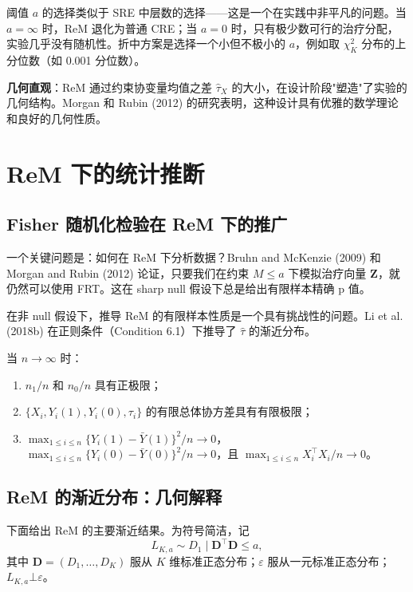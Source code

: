 阈值 $a$ 的选择类似于 SRE 中层数的选择——这是一个在实践中非平凡的问题。当 $a = \infty$ 时，ReM 退化为普通 CRE；当 $a = 0$ 时，只有极少数可行的治疗分配，实验几乎没有随机性。折中方案是选择一个小但不极小的 $a$，例如取 $\chi_K^2$ 分布的上分位数（如 0.001 分位数）。

\textbf{几何直观}：ReM 通过约束协变量均值之差 $\hat{\tau}_X$ 的大小，在设计阶段"塑造"了实验的几何结构。Morgan 和 Rubin (2012) 的研究表明，这种设计具有优雅的数学理论和良好的几何性质。

\section{ReM 下的统计推断}\label{sec:6-rem-inference}

\subsection{Fisher 随机化检验在 ReM 下的推广}\label{sec:6-rem-frt}

一个关键问题是：如何在 ReM 下分析数据？Bruhn and McKenzie (2009) 和 Morgan and Rubin (2012) 论证，只要我们在约束 $M \leq a$ 下模拟治疗向量 $\mathbf{Z}$，就仍然可以使用 FRT。这在 sharp null 假设下总是给出有限样本精确 p 值。

在非 null 假设下，推导 ReM 的有限样本性质是一个具有挑战性的问题。Li et al. (2018b) 在正则条件（Condition 6.1）下推导了 $\hat{\tau}$ 的渐近分布。

\begin{Condition}[条件 6.1]\label{cond:6.1}
当 $n \to \infty$ 时：
\begin{enumerate}
  \item $n_1 / n$ 和 $n_0 / n$ 具有正极限；
  \item $\{X_i, Y_i(1), Y_i(0), \tau_i\}$ 的有限总体协方差具有有限极限；
  \item $\max_{1 \leq i \leq n}\{Y_i(1) - \bar{Y}(1)\}^2 / n \to 0$，$\max_{1 \leq i \leq n}\{Y_i(0) - \bar{Y}(0)\}^2 / n \to 0$，且 $\max_{1 \leq i \leq n} X_i^\top X_i / n \to 0$。
\end{enumerate}
\end{Condition}

\subsection{ReM 的渐近分布：几何解释}\label{sec:6-rem-asymptotic}

下面给出 ReM 的主要渐近结果。为符号简洁，记
\[
L_{K,a} \sim D_1 \mid \mathbf{D}^\top \mathbf{D} \leq a ,
\]
其中 $\mathbf{D} = (D_1, \ldots, D_K)$ 服从 $K$ 维标准正态分布；$\varepsilon$ 服从一元标准正态分布；$L_{K,a} \bot \varepsilon$。


